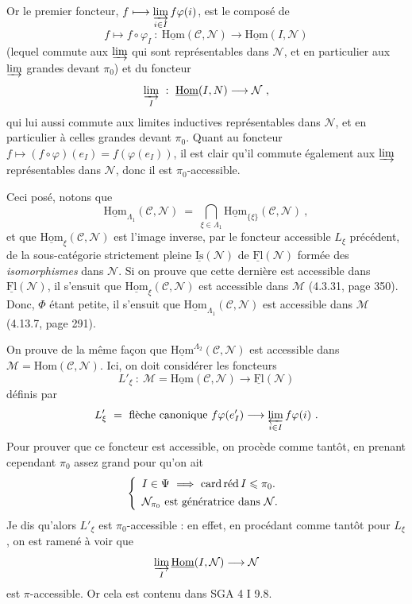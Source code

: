 \documentclass[11pt]{article}
\newcommand{\printedpage}[1]{\marginpar{\footnotesize p.~#1}}
\newcommand{\msp}[1]{\marginpar{\footnotesize [#1]}}
\newcommand{\cardred}{\mathop{\textup{card\,réd}}\nolimits}
\newcommand{\uHom}{\underline{\mathrm{Hom}}}
\newcommand{\uFl}{\underline{\mathrm{Fl}}}
\newcommand{\uIs}{\underline{\mathrm{Is}}}
\begin{document}
\msp{page 382}
Or le premier foncteur, $f \longmapsto \varinjlim\limits_{i\in I} f\varphi(i)$, est le composé de
\[
f \longmapsto f\circ\varphi_I \ : \ \uHom(\mathcal{C},\mathcal{N}) \longrightarrow \uHom(I,\mathcal{N})
\]
(lequel commute aux $\varinjlim$ qui sont représentables dans $\mathcal{N}$, et en particulier aux $\varinjlim$ grandes devant $\pi_0$) et du foncteur
\[
\varinjlim_{I} \ : \ \uHom(I,N) \longrightarrow \mathcal{N} \ , %
\]
qui lui aussi commute aux limites inductives représentables dans $\mathcal{N}$, et en particulier à celles grandes devant $\pi_0$. Quant au foncteur $f \longmapsto (f\circ\varphi)(e_I) = f(\varphi(e_I))$, il est clair qu'il commute également aux $\varinjlim$ représentables dans $\mathcal{N}$, donc il est $\pi_0$-accessible.

\printedpage{145}

Ceci posé, notons que
\[
\uHom_{\Lambda_1}(\mathcal{C},\mathcal{N}) \ = \ \bigcap_{\xi\in\Lambda_1} \uHom_{\{\xi\}}(\mathcal{C},\mathcal{N}) \ ,
\]
et que $\uHom_\xi(\mathcal{C},\mathcal{N})$ est l'image inverse, par le foncteur accessible $L_\xi$ précédent, de la sous-catégorie strictement pleine $\uIs(\mathcal{N})$ de $\uFl(\mathcal{N})$ formée des \textit{isomorphismes} dans $\mathcal{N}$. Si on prouve que cette dernière est accessible dans $\uFl(\mathcal{N})$, il s'ensuit que
\msp{page 383}
$\uHom_\xi(\mathcal{C},\mathcal{N})$ est accessible dans $\mathcal{M}$ (4.3.31, page 350). Donc, $\Phi$ étant petite, il s'ensuit que $\uHom_{\Lambda_1}(\mathcal{C},\mathcal{N})$ est accessible dans $\mathcal{M}$ (4.13.7, page 291).

On prouve de la même façon que $\uHom^{\Lambda_2}(\mathcal{C},\mathcal{N})$ est accessible dans $\mathcal{M} = \mathrm{Hom}(\mathcal{C},\mathcal{N})$. Ici, on doit considérer les foncteurs %
\[
L'_\xi \ : \ \mathcal{M} = \uHom(\mathcal{C},\mathcal{N}) \longrightarrow \uFl(\mathcal{N})
\]
définis par
\[
L'_\xi \ = \ \text{flèche canonique } f\varphi(e'_I) \longrightarrow \varprojlim_{i\in I} f\varphi(i) \ .
\]
Pour prouver que ce foncteur est accessible, on procède comme tantôt, en prenant cependant $\pi_0$ assez grand pour qu'on ait
\[
\left\{
\begin{array}{l}
I \in \Psi \ \Longrightarrow \ \cardred I \leqslant \pi_0. \\[1ex]
\mathcal{N}_{\pi_0} \text{ est génératrice dans } \mathcal{N}.
\end{array}
\right.
\]
Je dis qu'alors $L'_\xi$ est $\pi_0$-accessible : en effet, en procédant comme tantôt pour $L_\xi$, on est ramené à voir que
\[
\varinjlim_{I} \uHom(I,\mathcal{N}) \longrightarrow \mathcal{N}
\]
est $\pi$-accessible. Or cela est contenu dans SGA 4 I 9.8.
\end{document}
